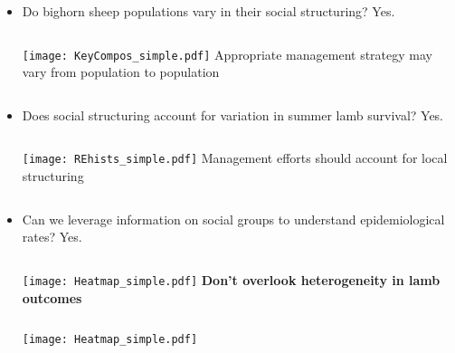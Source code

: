\documentclass[fleqn,xcolor=table]{beamer}
\begin{document}
{
\begin{frame}[t]
	\begin{itemize}
		\item[] \color{navy} \footnotesize Do bighorn sheep populations vary in their social
			structuring?
			\color{darkred} Yes.
	\begin{columns}
			\texttt{[image: KeyCompos\_simple.pdf]}
			\vspace{.1in}
			\footnotesize \color{darkred} Appropriate management
			strategy may vary from population to population
	\end{columns}
		\item[] \color{navy} \footnotesize Does social structuring account for variation in
			summer lamb survival?
			\color{darkred} Yes.
	\begin{columns}
		\column{.3\textwidth}
			\texttt{[image: REhists\_simple.pdf]}
			\vspace{.1in}
		\column{.7\textwidth}
			\footnotesize \color{darkred}Management efforts should
			account for local structuring
	\end{columns}

			\vspace{.1in}
		\item[] \color{navy} \footnotesize Can we leverage
				information on social groups to understand 
			epidemiological rates?
			\color{darkred} Yes.

	\begin{columns}
			\texttt{[image: Heatmap\_simple.pdf]}
			\vspace{.1in}
			\footnotesize \color{darkred}\textbf{Don't overlook
			heterogeneity in lamb outcomes}
	\end{columns}
			\texttt{[image: Heatmap\_simple.pdf]}
	\end{itemize}
\end{frame}
}
%
\end{document}
